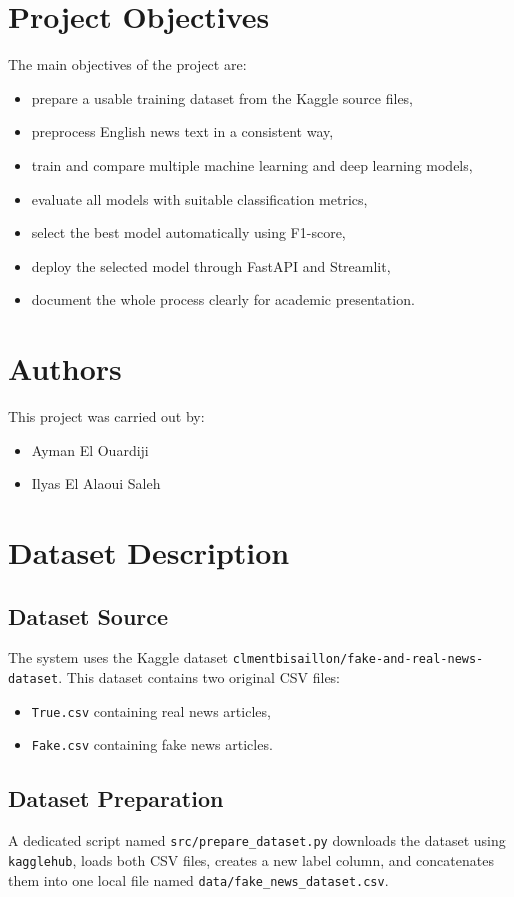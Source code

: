 \documentclass[12pt,a4paper]{article}
\begin{document}
\section{Project Objectives}
The main objectives of the project are:
\begin{itemize}[leftmargin=*]
\item prepare a usable training dataset from the Kaggle source files,
\item preprocess English news text in a consistent way,
\item train and compare multiple machine learning and deep learning models,
\item evaluate all models with suitable classification metrics,
\item select the best model automatically using F1-score,
\item deploy the selected model through FastAPI and Streamlit,
\item document the whole process clearly for academic presentation.
\end{itemize}

\section{Authors}
This project was carried out by:
\begin{itemize}[leftmargin=*]
\item Ayman El Ouardiji
\item Ilyas El Alaoui Saleh
\end{itemize}

\section{Dataset Description}
\subsection{Dataset Source}
The system uses the Kaggle dataset \texttt{clmentbisaillon/fake-and-real-news-dataset}. This dataset contains two original CSV files:
\begin{itemize}[leftmargin=*]
\item \texttt{True.csv} containing real news articles,
\item \texttt{Fake.csv} containing fake news articles.
\end{itemize}

\subsection{Dataset Preparation}
A dedicated script named \texttt{src/prepare\_dataset.py} downloads the dataset using \texttt{kagglehub}, loads both CSV files, creates a new label column, and concatenates them into one local file named \texttt{data/fake\_news\_dataset.csv}.
\end{document}

